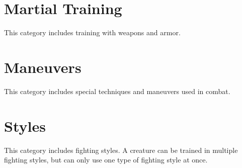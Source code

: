 \chapter{Martial Training}\label{ch:martialTraining}
This category includes training with weapons and armor.

	

	

	

	
	
	

	

	

	

	

	

	

	

	

	

	

\chapter{Maneuvers}\label{ch:maneuvers}
This category includes special techniques and maneuvers used in combat.

	

	

	

	
	
	

	

	
	
	

\chapter{Styles}\label{ch:styles}
This category includes fighting styles.
A creature can be trained in multiple fighting styles, but can only use one type of fighting style at once.

	